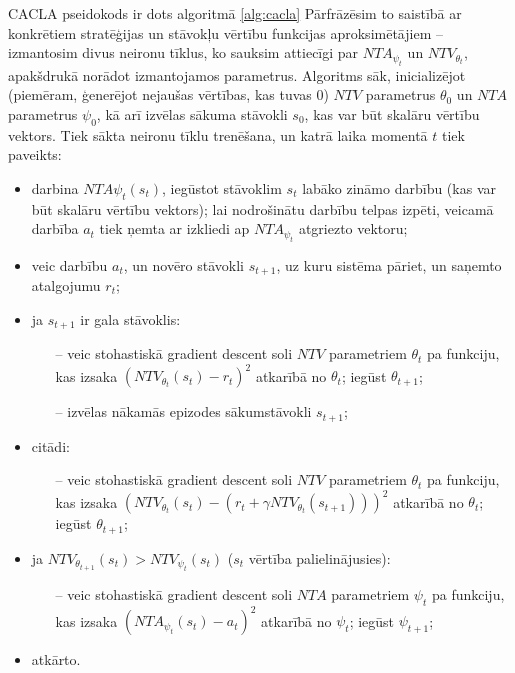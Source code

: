 \documentclass{ludis} %
\begin{document}
\FloatBarrier

CACLA pseidokods ir dots algoritmā \ref{alg:cacla}
Pārfrāzēsim to saistībā ar konkrētiem stratēģijas un stāvokļu vērtību funkcijas aproksimētājiem -- izmantosim divus neironu tīklus, ko sauksim attiecīgi par $NTA_{\psi_t}$ un $NTV_{\theta_t}$, apakšdrukā norādot izmantojamos parametrus.
Algoritms sāk, inicializējot (piemēram, ģenerējot nejaušas vērtības, kas tuvas $0$) $NTV$ parametrus $\theta_0$ un $NTA$ parametrus $\psi_0$, kā arī izvēlas sākuma stāvokli $s_0$, kas var būt skalāru vērtību vektors. Tiek sākta neironu tīklu trenēšana, un katrā laika momentā $t$ tiek paveikts:
\begin{itemize}
	\item darbina $NTA{\psi_t}(s_t)$, iegūstot stāvoklim $s_t$ labāko zināmo darbību (kas var būt skalāru vērtību vektors); lai nodrošinātu darbību telpas izpēti, veicamā darbība  $a_t$ tiek ņemta ar izkliedi ap $NTA_{\psi_t}$ atgriezto vektoru;
	\item veic darbību $a_t$, un novēro stāvokli $s_{t+1}$, uz kuru sistēma pāriet, un saņemto atalgojumu $r_t$; 
	\item ja $s_{t+1}$ ir gala stāvoklis:
	\begin{itemize}
		\item[--] veic stohastiskā gradient descent soli $NTV$ parametriem $\theta_t$ pa funkciju, kas izsaka $\left(NTV_{\theta_t}(s_t) - r_t\right)^2$ atkarībā no $\theta_t$; iegūst $\theta_{t+1}$; %
		\item[--] izvēlas nākamās epizodes sākumstāvokli $s_{t+1}$;
	\end{itemize}
	\item citādi:
	\begin{itemize}
		\item[--] veic stohastiskā gradient descent soli $NTV$ parametriem $\theta_t$ pa funkciju, kas izsaka $\left(NTV_{\theta_t}(s_t) - \left(r_t + \gamma NTV_{\theta_t}(s_{t+1}) \right) \right)^2$ atkarībā no $\theta_t$; iegūst $\theta_{t+1}$;
	\end{itemize}
	\item ja $NTV_{\theta_{t+1}}(s_t) > NTV_{\psi_t}(s_t)$ ($s_t$ vērtība palielinājusies):
	\begin{itemize}
		\item[--] veic stohastiskā gradient descent soli $NTA$ parametriem $\psi_t$ pa funkciju, kas izsaka $\left(NTA_{\psi_t}(s_t) - a_t\right)^2$ atkarībā no $\psi_t$; iegūst $\psi_{t+1}$;
	\end{itemize}
	\item atkārto.
\end{itemize}
\end{document}
